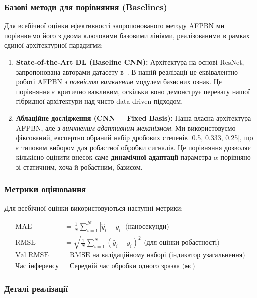\documentclass[12pt,a4paper]{article}
\begin{document}
\subsubsection{Базові методи для порівняння (Baselines)}

Для всебічної оцінки ефективності запропонованого методу AFPBN ми порівнюємо його з двома ключовими базовими лініями, реалізованими в рамках єдиної архітектурної парадигми:

\begin{enumerate}
	\item \textbf{State-of-the-Art DL (Baseline CNN):} Архітектура на основі ResNet, запропонована авторами датасету в~\cite{li2021multi}. В нашій реалізації це еквівалентно роботі AFPBN з \emph{повністю вимкненим} модулем базисних ознак. Це порівняння є критично важливим, оскільки воно демонструє перевагу нашої гібридної архітектури над чисто data-driven підходом.
	
	\item \textbf{Аблаційне дослідження (CNN + Fixed Basis):} Наша власна архітектура AFPBN, але з \emph{вимкненим адаптивним механізмом}. Ми використовуємо фіксований, експертно обраний набір дробових степенів [0.5, 0.333, 0.25], що є типовим вибором для робастної обробки сигналів. Це порівняння дозволяє кількісно оцінити внесок саме \textbf{динамічної адаптації} параметра $\alpha$ порівняно зі статичним, хоча й робастним, базисом.
\end{enumerate}

\subsubsection{Метрики оцінювання}

Для всебічної оцінки використовуються наступні метрики:

\begin{align}
	\text{MAE} &= \frac{1}{N} \sum_{i=1}^N |\hat{y}_i - y_i| \text{ (наносекунди)} \\
	\text{RMSE} &= \sqrt{\frac{1}{N} \sum_{i=1}^N (\hat{y}_i - y_i)^2} \text{ (для оцінки робастності)} \\
	\text{Val RMSE} &= \text{RMSE на валідаційному наборі (індикатор узагальнення)} \\
	\text{Час інференсу} &= \text{Середній час обробки одного зразка (мс)}
\end{align}

\subsubsection{Деталі реалізації}
\end{document}
